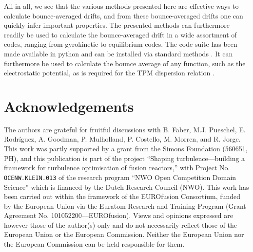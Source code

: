 All in all, we see that the various methods presented here are effective ways to calculate bounce-averaged drifts, and from these bounce-averaged drifts one can quickly infer important properties. The presented methods can furthermore readily be used to calculate the bounce-averaged drift in a wide assortment of codes, ranging from gyrokinetic to equilibrium codes. The code suite has been made available in python and can be installed via standard methods \cite{BAD_code}. It can furthermore be used to calculate the bounce average of any function, such as the electrostatic potential, as is required for the TPM dispersion relation \cite{helander2013collisionless}.


\section*{Acknowledgements}
The authors are grateful for fruitful discussions with B. Faber, M.J. Pueschel, E. Rodr\'iguez, A. Goodman, P. Mulholland, P. Costello, M. Morren, and R. Jorge. This work was partly supported by a grant from the Simons Foundation (560651, PH), and this publication is part of the project “Shaping turbulence—building a framework for turbulence optimisation of fusion reactors,” with Project No. \texttt{OCENW.KLEIN.013} of the research program “NWO Open Competition Domain Science” which is financed by the Dutch Research Council (NWO). This work has been carried out within the framework of the EUROfusion Consortium, funded by the European Union via the Euratom Research and Training Program (Grant Agreement No. 101052200—EUROfusion). Views and opinions expressed are however those of the author(s) only and do not necessarily reflect those of the European Union or the European Commission. Neither the European Union nor the European Commission can be held responsible for them.